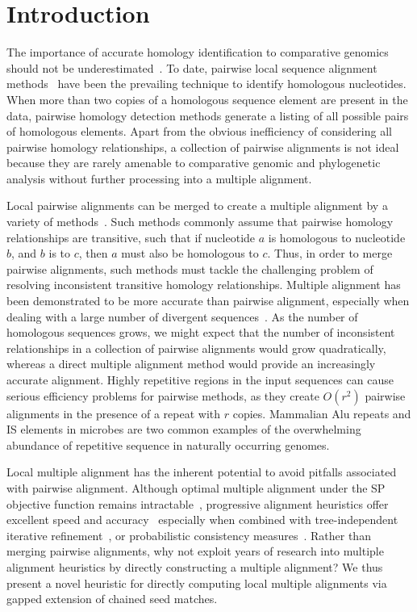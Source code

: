 \documentclass{ws-procs975x65}
\begin{document}
\section{Introduction}
The importance of accurate homology identification to comparative genomics should not be underestimated~\cite{Kumar07}. To date, pairwise local sequence alignment methods~\cite{ref-blastz, ref-ssearch} have been the prevailing technique to identify homologous nucleotides.  When more than two copies of a homologous sequence element are present in the data, pairwise homology detection methods generate a listing of all possible pairs of homologous elements.  Apart from the obvious inefficiency of considering all pairwise homology relationships, a collection of pairwise alignments is not ideal because they are rarely amenable to comparative genomic and phylogenetic analysis without further processing into a multiple alignment.

Local pairwise alignments can be merged to create a multiple alignment by a variety of methods~\cite{ref-tba,ref-aba,ref-dialign,ref-related1}. Such methods commonly assume that pairwise homology relationships are transitive, such that if nucleotide $a$ is homologous to nucleotide $b$, and $b$ is to $c$, then $a$ must also be homologous to $c$.  Thus, in order to merge pairwise alignments, such methods must tackle the challenging problem of resolving inconsistent transitive homology relationships.  Multiple alignment has been demonstrated to be more accurate than pairwise alignment, especially when dealing with a large number of divergent sequences~\cite{ref-mlagan,ref-aubergene}.  As the number of homologous sequences grows, we might expect that the number of inconsistent relationships in a collection of pairwise alignments would grow quadratically, whereas a direct multiple alignment method would provide an increasingly accurate alignment.  Highly repetitive regions in the input sequences can cause serious efficiency problems for pairwise methods, as they create $O(r^{2})$ pairwise alignments in the presence of a repeat with $r$ copies.  Mammalian Alu repeats and IS elements in microbes are two common examples of the overwhelming abundance of repetitive sequence in naturally occurring genomes.

Local multiple alignment has the inherent potential to avoid pitfalls associated with pairwise alignment. Although optimal multiple alignment under the SP objective function remains intractable~\cite{ref-wangjiang}, progressive alignment heuristics offer excellent speed and accuracy~\cite{ref-clustalw, ref-tcoffee} especially when combined with tree-independent iterative refinement~\cite{ref-muscle}, or probabilistic consistency measures~\cite{ref-probcons}. Rather than merging pairwise alignments, why not exploit years of research into multiple alignment heuristics by directly constructing a multiple alignment? We thus present a novel heuristic for directly computing local multiple alignments via gapped extension of chained seed matches.
\end{document}
